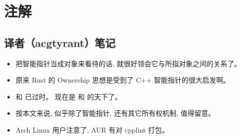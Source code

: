 \section{注解}

\subsection{译者（acgtyrant）笔记}

\begin{itemize}
  \item 把智能指针当成对象来看待的话, 就很好领会它与所指对象之间的关系了。
  \item 原来 Rust 的 Ownership 思想是受到了 C++ 智能指针的很大启发啊。
  \item {} 和  已过时。  现在是  和  的天下了。
  \item 按本文来说, 似乎除了智能指针, 还有其它所有权机制, 值得留意。
  \item Arch Linux 用户注意了, AUR 有对 cpplint 打包。
\end{itemize}
